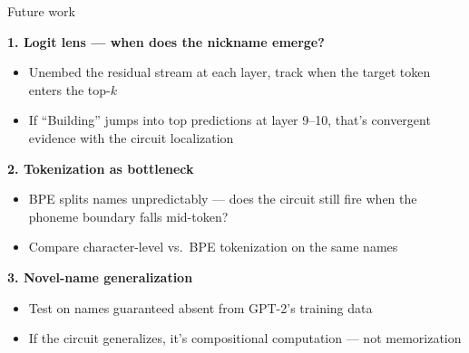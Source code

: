 \documentclass[10pt,aspectratio=169]{beamer}
\begin{document}
\begin{frame}{Future work}
\hypertarget{sl:tokenization}{}

\textbf{1. Logit lens --- when does the nickname emerge?}
\begin{itemize}
  \item Unembed the residual stream at each layer, track when the target token enters the top-$k$
  \item If ``Building'' jumps into top predictions at layer 9--10, that's convergent evidence with the circuit localization
\end{itemize}

\vspace{0.5em}
\textbf{2. Tokenization as bottleneck}

\begin{minipage}{0.55\textwidth}
\begin{itemize}
  \item BPE splits names unpredictably --- does the circuit still fire when the phoneme boundary falls mid-token?
  \item Compare character-level vs.\ BPE tokenization on the same names
\end{itemize}
\end{minipage}%
\hfill
\begin{minipage}{0.38\textwidth}
\begin{center}
\end{center}
\end{minipage}

\vspace{0.5em}
\textbf{3. Novel-name generalization}
\begin{itemize}
  \item Test on names guaranteed absent from GPT-2's training data
  \item If the circuit generalizes, it's compositional computation --- not memorization
\end{itemize}
\end{frame}
\end{document}
